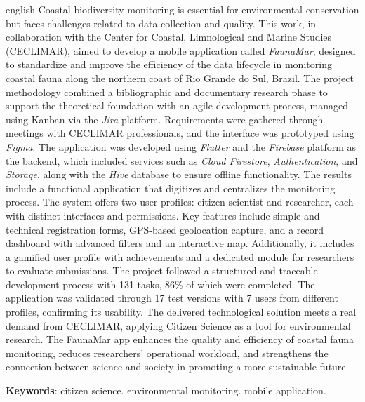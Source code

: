 \begin{resumo}[Abstract]
\begin{otherlanguage*}{english}
Coastal biodiversity monitoring is essential for environmental conservation but faces challenges related to data collection and quality. This work, in collaboration with the Center for Coastal, Limnological and Marine Studies (CECLIMAR), aimed to develop a mobile application called \textit{FaunaMar}, designed to standardize and improve the efficiency of the data lifecycle in monitoring coastal fauna along the northern coast of Rio Grande do Sul, Brazil.
The project methodology combined a bibliographic and documentary research phase to support the theoretical foundation with an agile development process, managed using Kanban via the \textit{Jira} platform. Requirements were gathered through meetings with CECLIMAR professionals, and the interface was prototyped using \textit{Figma}. The application was developed using \textit{Flutter} and the \textit{Firebase} platform as the backend, which included services such as \textit{Cloud Firestore}, \textit{Authentication}, and \textit{Storage}, along with the \textit{Hive} database to ensure offline functionality.
The results include a functional application that digitizes and centralizes the monitoring process. The system offers two user profiles: citizen scientist and researcher, each with distinct interfaces and permissions. Key features include simple and technical registration forms, GPS-based geolocation capture, and a record dashboard with advanced filters and an interactive map. Additionally, it includes a gamified user profile with achievements and a dedicated module for researchers to evaluate submissions. The project followed a structured and traceable development process with 131 tasks, 86\% of which were completed. The application was validated through 17 test versions with 7 users from different profiles, confirming its usability. The delivered technological solution meets a real demand from CECLIMAR, applying Citizen Science as a tool for environmental research. The FaunaMar app enhances the quality and efficiency of coastal fauna monitoring, reduces researchers' operational workload, and strengthens the connection between science and society in promoting a more sustainable future.

\textbf{Keywords}: citizen science. environmental monitoring. mobile application.
\end{otherlanguage*}
\end{resumo}